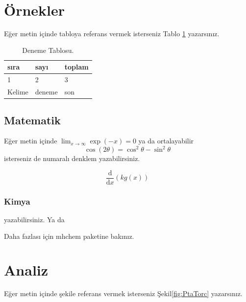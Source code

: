 \lipsum[1-2]
\section{Örnekler}
Eğer metin içinde tabloya referans vermek isterseniz Tablo \ref{tab:den} yazarsınız. 
\begin{table}
\centering
\caption{Deneme Tablosu.}\label{tab:den}
\begin{tabular}{|l|l|l|}
\hline
sıra   & sayı   & toplam \\ \hline
1      & 2      & 3      \\ \hline
Kelime & deneme & son    \\ \hline
\end{tabular}
\end{table}


\subsection{Matematik}
Eğer metin içinde \(\lim_{x \to \infty} \exp(-x) = 0\) ya da ortalayabilir
\begin{displaymath}
\cos (2\theta) = \cos^2 \theta - \sin^2 \theta
\end{displaymath}
isterseniz de numaralı denklem yazabilirsiniz.

\begin{equation}
\frac{\mathrm d}{\mathrm d x} \left( k g(x) \right)
\end{equation}
\subsubsection{Kimya}
 yazabilirsiniz. Ya da


Daha fazlası için mhchem paketine bakınız.
 
\section{Analiz}
Eğer metin içinde şekile referans vermek isterseniz Şekil\ref{fig:PtaTorc} yazarsınız. 

